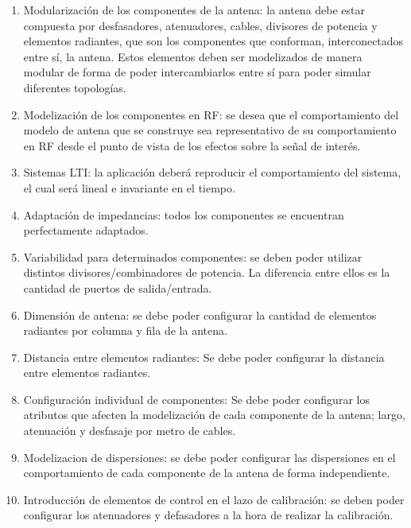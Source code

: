 \begin{enumerate}
    \item Modularización de los componentes de la antena: la antena debe estar compuesta por desfasadores, atenuadores, cables,
		divisores de potencia y elementos radiantes, que son los componentes que conforman, interconectados entre sí, la antena. Estos
		elementos deben ser modelizados de manera modular de forma de poder intercambiarlos entre sí para poder simular diferentes
		topologías.

	\item Modelización de los componentes en RF: se desea que el comportamiento del modelo de antena que se construye sea 
		representativo de su comportamiento en RF desde el punto de vista de los efectos sobre la señal de interés.

    \item Sistemas LTI: la aplicación deberá reproducir el comportamiento del sistema, el cual será lineal e invariante
		en el tiempo.

	\item Adaptación de impedancias: todos los componentes se encuentran perfectamente adaptados.

    \item Variabilidad para determinados componentes: se deben poder utilizar distintos divisores/combinadores de potencia.
		La diferencia entre ellos es la cantidad de puertos de salida/entrada.

    \item Dimensión de antena: se debe poder configurar la cantidad de elementos radiantes por columna y fila de la antena.
    \item Distancia entre elementos radiantes: Se debe poder configurar la distancia entre elementos radiantes.

    \item Configuración individual de componentes: Se debe poder configurar los atributos que afecten la modelización de cada
		componente de la antena; largo, atenuación y desfasaje por metro de cables.

    \item Modelizacion de dispersiones: se debe poder configurar las dispersiones en el comportamiento de cada componente de la
		antena de forma independiente.

    \item Introducción de elementos de control en el lazo de calibración: se deben poder configurar los atenuadores y
		defasadores a la hora de realizar la calibración.


\end{enumerate}
